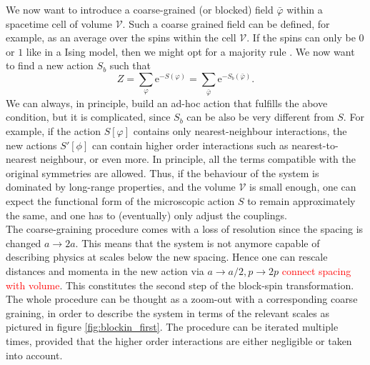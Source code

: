 We now want to introduce a coarse-grained (or blocked) field $\bar\varphi$ within a spacetime cell of volume $\mathcal{V}$. Such a coarse grained field can be defined, for example, as an average over the spins within the cell $\mathcal{V}$. If the spins can only be $0$ or $1$ like in a Ising model, then we might opt for a majority rule \cite{cardy_1996}.
We now want to find a new action $S_b$ such that 
\begin{equation}
    Z=\sum_{\varphi} \mathrm{e}^{-S(\varphi)}= \sum_{\bar\varphi} \mathrm{e}^{-S_b\left(\bar\varphi\right)}.
\end{equation}
We can always, in principle, build an ad-hoc action that fulfills the above condition, but it is complicated, since $S_b$ can be also be very different from $S$. For example, if the action $S[\varphi]$ contains only nearest-neighbour interactions, the new actions $S'[\phi]$ can contain higher order interactions such as nearest-to-nearest neighbour, or even more. In principle, all the terms compatible with the original symmetries are allowed. 
Thus, if the behaviour of the system is dominated by long-range properties, and the volume $\mathcal{V}$ is small enough, one can expect the functional form of the microscopic action $S$ to remain approximately the same, and one has to (eventually) only adjust the couplings. \\
The coarse-graining procedure comes with a loss of resolution since the spacing is changed $a \to 2a$. This means that the system is not anymore capable of describing physics at scales below the new spacing. Hence one can rescale distances and momenta in the new action via $a \to a/2, p \to 2p$ \textcolor{red}{connect spacing with volume}. This constitutes the second step of the block-spin transformation. The whole procedure can be thought as a zoom-out with a corresponding coarse graining, in order to describe the system in terms of the relevant scales as pictured in figure \ref{fig:blockin_first}. The procedure can be iterated multiple times, provided that the higher order interactions are either negligible or taken into account. \\

